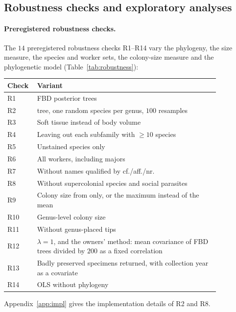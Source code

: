 \documentclass[11pt]{article}
\begin{document}
\subsection{Robustness checks and exploratory analyses}\label{sec:robust}

\paragraph{Preregistered robustness checks.} The $14$ preregistered robustness checks R1--R14 vary the phylogeny, the
size measure, the species and worker sets, the colony-size measure and the phylogenetic model
(Table~\ref{tab:robustness}):
\begin{center}
\small
\begin{tabular}{@{}l>{\raggedright\arraybackslash}p{0.86\linewidth}@{}}
\toprule
Check & Variant \\
\midrule
R1 & FBD posterior trees \\
R2 & \citet{borowiec2025} tree, one random species per genus, $100$ resamples \\
R3 & Soft tissue instead of body volume \\
R4 & Leaving out each subfamily with $\ge 10$ species \\
R5 & Unstained species only \\
R6 & All workers, including majors \\
R7 & Without names qualified by cf./aff./nr. \\
R8 & Without supercolonial species and social parasites~\citep[Supplementary Table~21]{bellroberts2024} \\
R9 & Colony size from \citet{bellroberts2024} only, or the maximum instead of the mean \\
R10 & Genus-level colony size \\
R11 & Without genus-placed tips \\
R12 & $\lambda = 1$, and the owners' method: mean covariance of FBD trees divided by $200$ as a fixed correlation \\
R13 & Badly preserved specimens returned, with collection year as a covariate \\
R14 & OLS without phylogeny \\
\bottomrule
\end{tabular}
\end{center}
Appendix~\ref{app:impl} gives the implementation details of R2 and R8.


\end{document}
